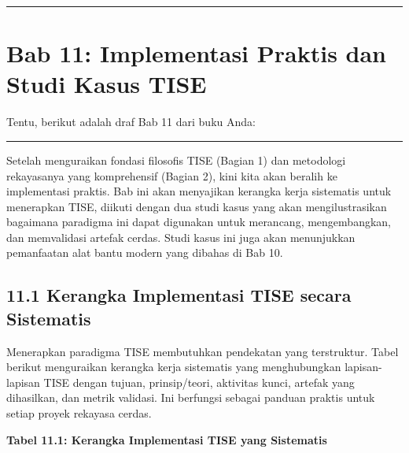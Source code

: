 \documentclass[
  letterpaper,
  DIV=11,
  numbers=noendperiod]{scrreprt}
\begin{document}
\begin{center}\rule{0.5\linewidth}{0.5pt}\end{center}


\chapter{\texorpdfstring{\textbf{Bab 11: Implementasi Praktis dan Studi
Kasus
TISE}}{Bab 11: Implementasi Praktis dan Studi Kasus TISE}}\label{bab-11-implementasi-praktis-dan-studi-kasus-tise}

Tentu, berikut adalah draf Bab 11 dari buku Anda:

\begin{center}\rule{0.5\linewidth}{0.5pt}\end{center}

Setelah menguraikan fondasi filosofis TISE (Bagian 1) dan metodologi
rekayasanya yang komprehensif (Bagian 2), kini kita akan beralih ke
implementasi praktis. Bab ini akan menyajikan kerangka kerja sistematis
untuk menerapkan TISE, diikuti dengan dua studi kasus yang akan
mengilustrasikan bagaimana paradigma ini dapat digunakan untuk
merancang, mengembangkan, dan memvalidasi artefak cerdas. Studi kasus
ini juga akan menunjukkan pemanfaatan alat bantu modern yang dibahas di
Bab 10.

\section{\texorpdfstring{\textbf{11.1 Kerangka Implementasi TISE secara
Sistematis}}{11.1 Kerangka Implementasi TISE secara Sistematis}}\label{kerangka-implementasi-tise-secara-sistematis}

Menerapkan paradigma TISE membutuhkan pendekatan yang terstruktur. Tabel
berikut menguraikan kerangka kerja sistematis yang menghubungkan
lapisan-lapisan TISE dengan tujuan, prinsip/teori, aktivitas kunci,
artefak yang dihasilkan, dan metrik validasi. Ini berfungsi sebagai
panduan praktis untuk setiap proyek rekayasa cerdas.

\textbf{Tabel 11.1: Kerangka Implementasi TISE yang Sistematis}
\end{document}
